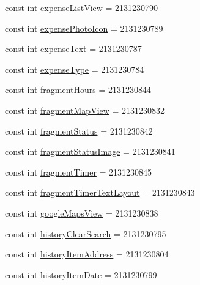 \begin{DoxyCompactItemize}
\item 
const int \hyperlink{class_field_service_1_1_android_1_1_resource_1_1_id_a2c2559c8baf1c80af6c6cb7427c953dd}{expense\+List\+View} = 2131230790
\item 
const int \hyperlink{class_field_service_1_1_android_1_1_resource_1_1_id_a31876c3b3cba942548a9f1edd78ace7e}{expense\+Photo\+Icon} = 2131230789
\item 
const int \hyperlink{class_field_service_1_1_android_1_1_resource_1_1_id_a04b18d49408db4c7237b0d3000fd31f4}{expense\+Text} = 2131230787
\item 
const int \hyperlink{class_field_service_1_1_android_1_1_resource_1_1_id_a97ea797ed3549234cd4db3fad2891c44}{expense\+Type} = 2131230784
\item 
const int \hyperlink{class_field_service_1_1_android_1_1_resource_1_1_id_a94d3c703aa797789e988f128f59e1d5d}{fragment\+Hours} = 2131230844
\item 
const int \hyperlink{class_field_service_1_1_android_1_1_resource_1_1_id_a676eaa62300efddf94767725cfd5fea9}{fragment\+Map\+View} = 2131230832
\item 
const int \hyperlink{class_field_service_1_1_android_1_1_resource_1_1_id_a74709175aeda2e150cf210f8e59c9067}{fragment\+Status} = 2131230842
\item 
const int \hyperlink{class_field_service_1_1_android_1_1_resource_1_1_id_a0855579e365b4f1df003bdb37f4d8121}{fragment\+Status\+Image} = 2131230841
\item 
const int \hyperlink{class_field_service_1_1_android_1_1_resource_1_1_id_a66ed9c949235c7b6144f6f016527a4af}{fragment\+Timer} = 2131230845
\item 
const int \hyperlink{class_field_service_1_1_android_1_1_resource_1_1_id_a85f45a5f7bc66f62e96ec63eb688c355}{fragment\+Timer\+Text\+Layout} = 2131230843
\item 
const int \hyperlink{class_field_service_1_1_android_1_1_resource_1_1_id_a11d390c1118a5b940cdf94a7a51286d9}{google\+Maps\+View} = 2131230838
\item 
const int \hyperlink{class_field_service_1_1_android_1_1_resource_1_1_id_a4afa7e31da80e6c6d1151a32c5f297d0}{history\+Clear\+Search} = 2131230795
\item 
const int \hyperlink{class_field_service_1_1_android_1_1_resource_1_1_id_a97ca126f4643627ffe129daf781c6bfc}{history\+Item\+Address} = 2131230804
\item 
const int \hyperlink{class_field_service_1_1_android_1_1_resource_1_1_id_a1c99d0ec4277880294edf0bfb209736c}{history\+Item\+Date} = 2131230799

\end{DoxyCompactItemize}
